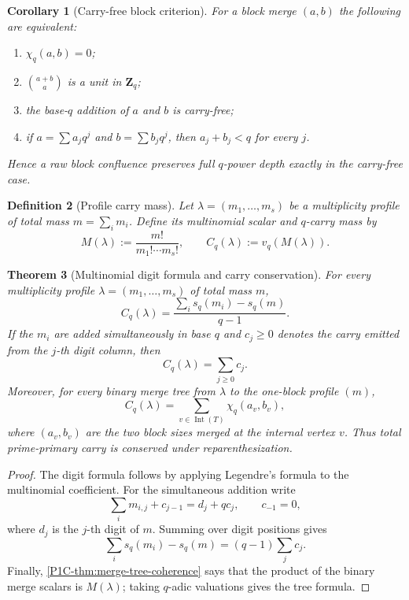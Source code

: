 \documentclass[11pt]{article}
\newtheorem{theorem}{Theorem}[section]
\newtheorem{corollary}[theorem]{Corollary}
\newtheorem{definition}[theorem]{Definition}
\theoremstyle{remark}
\newcommand{\Z}{\mathbf Z}
\begin{document}
\begin{corollary}[Carry-free block criterion]\label{P1C-cor:carry-free-block}
For a block merge $(a,b)$ the following are equivalent:
\begin{enumerate}[label=\textup{(\roman*)}]
\item $\chi_q(a,b)=0$;
\item $\binom{a+b}{a}$ is a unit in $\Z_q$;
\item the base-$q$ addition of $a$ and $b$ is carry-free;
\item if $a=\sum a_jq^j$ and $b=\sum b_jq^j$, then $a_j+b_j<q$ for every $j$.
\end{enumerate}
Hence a raw block confluence preserves full $q$-power depth exactly in the carry-free case.
\end{corollary}

\begin{definition}[Profile carry mass]\label{P1C-def:profile-carry-mass}
Let $\lambda=(m_1,\ldots,m_s)$ be a multiplicity profile of total mass
$m=\sum_i m_i$.  Define its multinomial scalar and $q$-carry mass by
\[
 M(\lambda):=\frac{m!}{m_1!\cdots m_s!},
 \qquad
 \boxed{C_q(\lambda):=v_q(M(\lambda)).}
\]
\end{definition}

\begin{theorem}[Multinomial digit formula and carry conservation]\label{P1C-thm:multinomial-carry}
For every multiplicity profile $\lambda=(m_1,\ldots,m_s)$ of total mass $m$,
\[
 \boxed{
 C_q(\lambda)
 =\frac{\sum_i s_q(m_i)-s_q(m)}{q-1}.}
\]
If the $m_i$ are added simultaneously in base $q$ and $c_j\ge0$ denotes the carry emitted from the $j$-th digit column, then
\[
 \boxed{C_q(\lambda)=\sum_{j\ge0}c_j.}
\]
Moreover, for every binary merge tree from $\lambda$ to the one-block profile $(m)$,
\[
 \boxed{
 C_q(\lambda)
 =\sum_{v\in\operatorname{Int}(T)}\chi_q(a_v,b_v),}
\]
where $(a_v,b_v)$ are the two block sizes merged at the internal vertex $v$.  Thus total prime-primary carry is conserved under reparenthesization.
\end{theorem}

\begin{proof}
The digit formula follows by applying Legendre's formula to the multinomial coefficient.  For the simultaneous addition write
\[
 \sum_i m_{i,j}+c_{j-1}=d_j+qc_j,
 \qquad c_{-1}=0,
\]
where $d_j$ is the $j$-th digit of $m$.  Summing over digit positions gives
\[
 \sum_i s_q(m_i)-s_q(m)=(q-1)\sum_jc_j.
\]
Finally, \cref{P1C-thm:merge-tree-coherence} says that the product of the binary merge scalars is $M(\lambda)$; taking $q$-adic valuations gives the tree formula.
\end{proof}
\end{document}

